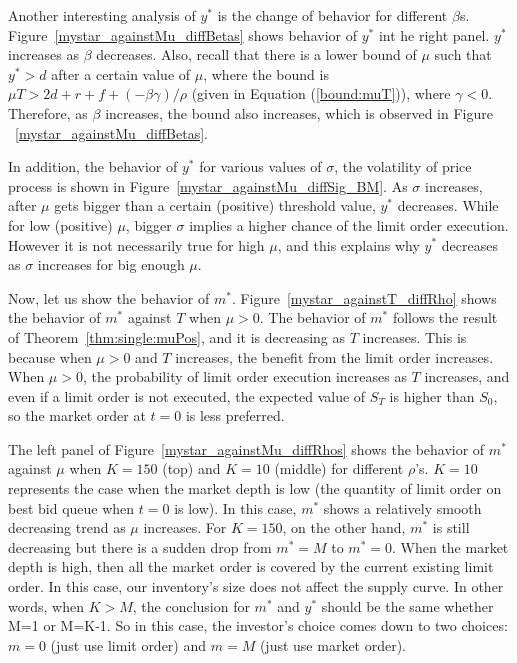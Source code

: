 \documentclass[11pt]{article}
\theoremstyle{plain}
\numberwithin{equation}{section}
\begin{document}
{ 
 
\par Another interesting analysis of $y^*$ is the change of behavior for different $\beta$s. Figure~\ref{mystar_againstMu_diffBetas} shows behavior of $y^*$ int he right panel. $y^*$ increases as $\beta$ decreases. Also, recall that there is a lower bound of $\mu$ such that $y^*>d$ after a certain value of $\mu$, where the bound is $\mu T>2d+r+f+(-\beta \gamma)/\rho$ (given in  Equation (\ref{bound:muT})), where $\gamma<0$. Therefore, as $\beta$ increases, the bound also increases, which is observed in Figure ~\ref{mystar_againstMu_diffBetas}. 

\par In addition, the behavior of $y^*$ for various values of $\sigma$, the volatility of price process is shown in Figure~\ref{mystar_againstMu_diffSig_BM}.  As $\sigma$ increases, after $\mu$ gets bigger than a certain (positive) threshold value, $y^*$ decreases. While for low (positive) $\mu$, bigger $\sigma$ implies a higher chance of the limit order execution. However it is not necessarily true for high $\mu$, and this explains why $y^*$ decreases as $\sigma$ increases for big enough $\mu$.

\medskip
\par  Now, let us show the behavior of $m^*$. Figure~\ref{mystar_againstT_diffRho} shows the behavior of $m^*$ against $T$ when $\mu>0$. The behavior of $m^*$ follows the result of Theorem~\ref{thm:single:muPos}, and it is decreasing as $T$ increases. This is because when $\mu>0$ and $T$ increases, the benefit from the limit order increases. When $\mu>0$, the probability of limit order execution increases as $T$ increases, and even if a limit order is not executed, the expected value of $S_T$ is higher than $S_0$, so the market order at $t=0$ is less preferred. 


\par The left panel of Figure~\ref{mystar_againstMu_diffRhos} shows the behavior of $m^*$ against $\mu$ when $K=150$ (top) and $K=10$ (middle) for different $\rho$'s. $K=10$ represents the case when the market depth is low (the quantity of limit order on best bid queue when $t=0$ is low). In this case, $m^*$ shows a relatively smooth decreasing trend as $\mu$ increases.
 For $K=150$, on the other hand, $m^*$ is still decreasing but there is a sudden drop from $m^*=M$ to $m^*=0$. When the market depth is high, then all the market order is covered by the current existing limit order. In this case, our inventory's size does not affect the supply curve. In other words, when $K>M$, the conclusion for $m^*$ and $y^*$ should be the same whether M=1 or M=K-1. So in this case, the investor's choice comes down to two choices: $m=0$ (just use limit order) and $m=M$ (just use market order). 


}
\end{document}

